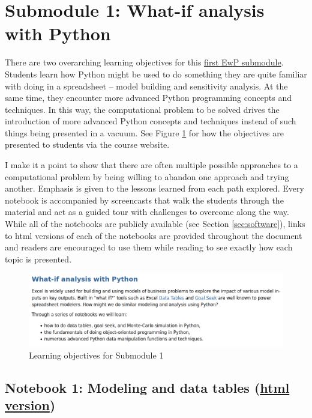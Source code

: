\documentclass[ited]{informs3}                      %
\begin{document}
\section{Submodule 1: What-if analysis with Python}

There are two overarching learning objectives for this \href{http://www.sba.oakland.edu/faculty/isken/courses/aap/mod3a_whatif.html}{first EwP submodule}. Students learn how Python might be used to do something they are quite familiar with doing in a spreadsheet -- model building and sensitivity analysis. At the same time, they encounter more advanced Python programming concepts and techniques. In this way, the computational problem to be solved drives the introduction of more advanced Python concepts and techniques instead of such things being presented in a vacuum. See Figure \ref{fig:objectives_whatif} for how the objectives are presented to students via the course website.

I make it a point to show that there are often multiple possible approaches to a computational problem by being willing to abandon one approach and trying another. Emphasis is given to the lessons learned from each path explored. Every notebook is accompanied by screencasts that walk the students through the material and act as a guided tour with challenges to overcome along the way. While all of the notebooks are publicly available (see Section \ref{sec:software}), links to html versions of each of the notebooks are provided throughout the document and readers are encouraged to use them while reading to see exactly how each topic is presented. 

\begin{figure}[!htbp]
	\includegraphics[width=1.0\textwidth]{images/objectives_whatif}
	\caption{Learning objectives for Submodule 1}
	\label{fig:objectives_whatif}
\end{figure}
 
 
\subsection{Notebook 1: Modeling and data tables (\href{http://www.sba.oakland.edu/faculty/isken/excel_with_python/what_if_1_model_datatable.html}{html version})}
\end{document}
